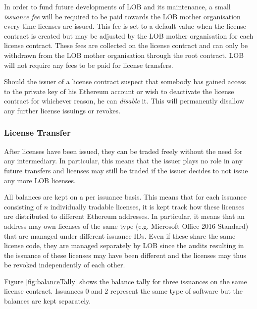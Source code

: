 \documentclass[a4paper]{article}
\begin{document}
In order to fund future developments of LOB and its maintenance, a small \emph{issuance fee} will be required to be paid towards the LOB mother organisation every time licenses are issued. This fee is set to a default value when the license contract is created but may be adjusted by the LOB mother organisation for each license contract. These fees are collected on the license contract and can only be withdrawn from the LOB mother organisation through the root contract. LOB will not require any fees to be paid for license transfers.

Should the issuer of a license contract suspect that somebody has gained access to the private key of his Ethereum account or wish to deactivate the license contract for whichever reason, he can \emph{disable} it. This will permanently disallow any further license issuings or revokes. 





\subsubsection{License Transfer}
\label{ch:licenseContractTransfer}

After licenses have been issued, they can be traded freely without the need for any intermediary. In particular, this means that the issuer plays no role in any future transfers and licenses may still be traded if the issuer decides to not issue any more LOB licenses.

All balances are kept on a per issuance basis. This means that for each issuance consisting of $n$ individually tradable licenses, it is kept track how these licenses are distributed to different Ethereum addresses. In particular, it means that an address may own licenses of the same type (e.g. Microsoft Office 2016 Standard) that are managed under different issuance IDs. Even if these share the same license code, they are managed separately by LOB since the audits resulting in the issuance of these licenses may have been different and the licenses may thus be revoked independently of each other.

Figure \ref{fig:balanceTally} shows the balance tally for three issuances on the same license contract. Issuances 0 and 2 represent the same type of software but the balances are kept separately.
\end{document}
